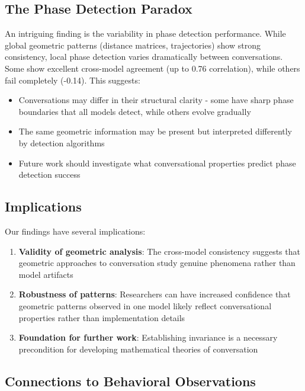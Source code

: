\documentclass[11pt,letterpaper]{article}
\newcommand{\phaseDetectionBest}{0.76}
\newcommand{\phaseDetectionWorst}{-0.14}
\begin{document}
\subsection{The Phase Detection Paradox}

An intriguing finding is the variability in phase detection performance. While global geometric patterns (distance matrices, trajectories) show strong consistency, local phase detection varies dramatically between conversations. Some show excellent cross-model agreement (up to \phaseDetectionBest{} correlation), while others fail completely (\phaseDetectionWorst{}). This suggests:

\begin{itemize}
\item Conversations may differ in their structural clarity - some have sharp phase boundaries that all models detect, while others evolve gradually
\item The same geometric information may be present but interpreted differently by detection algorithms
\item Future work should investigate what conversational properties predict phase detection success
\end{itemize}

\subsection{Implications}

Our findings have several implications:

\begin{enumerate}
\item \textbf{Validity of geometric analysis}: The cross-model consistency suggests that geometric approaches to conversation study genuine phenomena rather than model artifacts

\item \textbf{Robustness of patterns}: Researchers can have increased confidence that geometric patterns observed in one model likely reflect conversational properties rather than implementation details

\item \textbf{Foundation for further work}: Establishing invariance is a necessary precondition for developing mathematical theories of conversation
\end{enumerate}

\subsection{Connections to Behavioral Observations}
\end{document}
